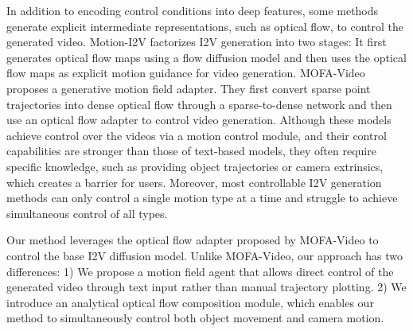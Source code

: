 In addition to encoding control conditions into deep features, some methods generate explicit intermediate representations, such as optical flow, to control the generated video. Motion-I2V \cite{shi2024motion} factorizes I2V generation into two stages: It first generates optical flow maps using a flow diffusion model and then uses the optical flow maps as explicit motion guidance for video generation. MOFA-Video \cite{niu2024mofa} proposes a generative motion field adapter. They first convert sparse point trajectories into dense optical flow through a sparse-to-dense network and then use an optical flow adapter to control video generation. Although these models achieve control over the videos via a motion control module, and their control capabilities are stronger than those of text-based models, they often require specific knowledge, such as providing object trajectories or camera extrinsics, which creates a barrier for users. Moreover, most controllable I2V generation methods can only control a single motion type at a time and struggle to achieve simultaneous control of all types.

Our method leverages the optical flow adapter proposed by MOFA-Video \cite{niu2024mofa} to control the base I2V diffusion model. Unlike MOFA-Video, our approach has two differences: 1) We propose a motion field agent that allows direct control of the generated video through text input rather than manual trajectory plotting. 2) We introduce an analytical optical flow composition module, which enables our method to simultaneously control both object movement and camera motion.
